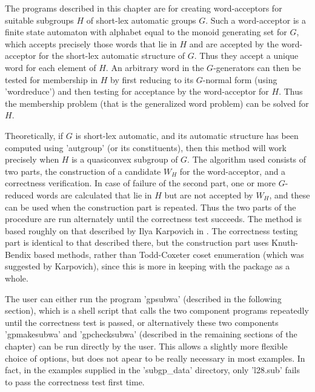 The programs described in this chapter are for creating word-acceptors for
suitable subgroups $H$ of short-lex automatic groups $G$. Such a
word-acceptor is a finite state automaton with alphabet equal to the
monoid generating set for $G$, which accepts precisely those words that lie
in $H$ and are accepted by the word-acceptor for the short-lex automatic
structure of $G$. Thus they accept a unique word for each element of $H$.
An arbitrary word in the $G$-generators can then be tested for membership in $H$
by first reducing to its $G$-normal form (using 'wordreduce') and then
testing for acceptance by the word-acceptor for $H$. Thus the membership
problem (that is the generalized word problem) can be solved for $H$.

Theoretically, if $G$ is short-lex automatic, and its automatic structure
has been computed using 'autgroup' (or its constituents), then this method
will work precisely when $H$ is a quasiconvex subgroup of $G$. The algorithm
used consists of two parts, the construction of a candidate $W_H$ for the
word-acceptor, and a correctness verification. In case of failure of the
second part, one or more $G$-reduced words are calculated that lie in $H$
but are not accepted by $W_H$, and these can be used when the
construction part is repeated. Thus the two parts of the procedure are run
alternately until the correctness test succeeds. The method is based
roughly on that described by Ilya Karpovich in \cite{Kar94}. The correctness
testing part is identical to that described there, but the construction part
uses Knuth-Bendix based methods, rather than Todd-Coxeter coset enumeration
(which was suggested by Karpovich), since this is more in keeping with the
{\KBMAG} package as a whole.

The user can either run the program 'gpsubwa' (described in the following
section), which is a shell script that calls the two component programs
repeatedly until the correctness test is passed, or alternatively these
two components 'gpmakesubwa' and 'gpchecksubwa' (described in the remaining
sections of the chapter) can be run directly by the user. This allows a
slightly more flexible choice of options, but does not apear to be really
necessary in most examples. In fact, in the examples supplied in the
{\KBMAG} 'subgp\_data' directory, only 'l28.sub' fails to pass the
correctness test first time.


